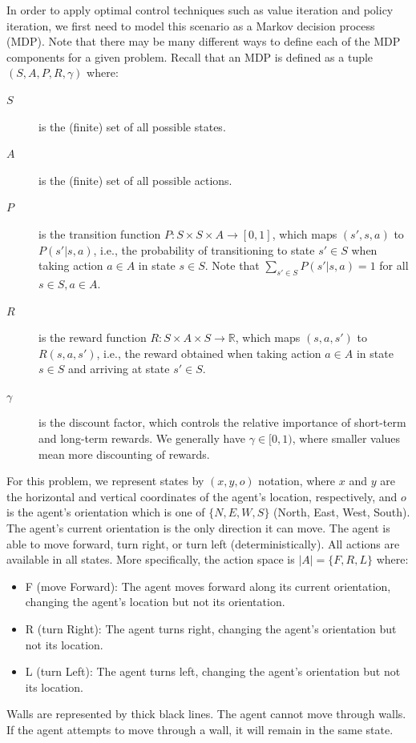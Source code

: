 \documentclass[12pt]{article}
\begin{document}
In order to apply optimal control techniques such as value iteration and policy iteration, we first need to model this scenario as a Markov decision process (MDP). Note that there may be many different ways to define each of the MDP components for a given problem. Recall that an MDP is defined as a tuple
$(S, A, P, R, \gamma)$ where:
\begin{description}
\item[$S$] is the (finite) set of all possible states.
\item[$A$] is the (finite) set of all possible actions.
\item[$P$] is the transition function $P: S \times S \times A \to [0, 1]$, 
  which maps $(s', s, a)$ to $P(s'|s, a)$, i.e., 
  the probability of transitioning to state $s'\in S$ when taking action
  $a\in A$ in state $s\in S$. 
  Note that $\sum _{s' \in S} P(s' | s, a) = 1$ for all 
  $s \in S, a \in A$.
\item[$R$] is the reward function $R : S \times A \times S \to \mathbb R$,
which maps $(s, a, s')$ to $R(s, a, s')$, i.e., 
the reward obtained when taking action $a \in A$ in state $s \in S$ and 
arriving at state $s' \in S$.
\item[$\gamma$] is the discount factor, which controls the relative importance of short-term and long-term rewards. We generally have $\gamma \in [0, 1)$, where smaller values mean more discounting of rewards.
\end{description}

For this problem, we represent states by $(x, y, o)$ notation, where $x$ and $y$ are the horizontal and vertical coordinates of the agent's location, respectively, and $o$ is the agent's orientation which is one of $\{ N, E, W, S \}$ (North, East, West, South). The agent's current orientation is the only direction it can move. The agent is able to move forward, turn right, or turn left (deterministically). All actions are available in all states. More specifically, the action space is $|A| = \{F,R,L\}$ where:
\begin{itemize}
\item F (move Forward): The agent moves forward along its current orientation, changing the agent's location but not its orientation.
\item R (turn Right): The agent turns right, changing the agent's orientation but not its location.
\item L (turn Left): The agent turns left, changing the agent's orientation but not its location.
\end{itemize}
Walls are represented by thick black lines. The agent cannot move through walls. If the agent attempts to move through a wall,  it will remain in the same state.
\end{document}
